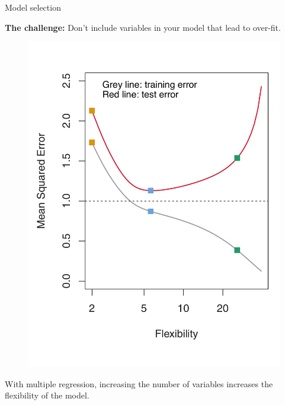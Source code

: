 \documentclass[aspectratio=169]{beamer}
\begin{document}
\begin{frame}{Model selection}

\textbf{The challenge:} Don't include variables in your model that lead to over-fit.

\vspace{-5mm}

\begin{figure}
\includegraphics[height=0.8\textheight]{islr2_9b}
\end{figure}

\vspace{-10mm}
With multiple regression, increasing the number of variables increases the flexibility of the model.

\end{frame}
\end{document}
